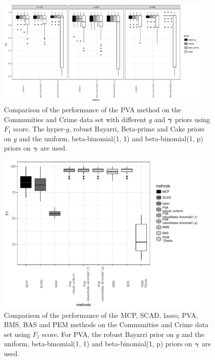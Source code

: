 \begin{figure}
	\begin{center}	
		\includegraphics[width=0.95\textwidth]{./commPVA_F1.pdf}  
	\end{center}
	\caption{Comparison of the performance of the PVA method on the
						Communities and Crime data set with different $g$ and ${\boldsymbol \gamma}$ priors using $F_1$ score.
						The hyper-$g$,
						robust Bayarri, Beta-prime and Cake priors on $g$ and the uniform, beta-binomial(1, 1) and beta-binomial(1, p) priors on ${\boldsymbol \gamma}$ are used.}
	\label{fig:commPVA_F1}
\end{figure}

\begin{figure}
	\begin{center}	
		\includegraphics[width=0.95\textwidth]{./commPVA_F1_compare.pdf}  
	\end{center}
	\caption{Comparison of the performance of the MCP, SCAD, lasso, PVA, BMS, BAS and PEM methods on the
						Communities and Crime data set using $F_1$ score. For PVA, the
						robust Bayarri prior on $g$ and the uniform, beta-binomial(1, 1) and beta-binomial(1, p) priors
						on ${\boldsymbol \gamma}$ are used.}
	\label{fig:commPVA_F1_compare}
\end{figure}


